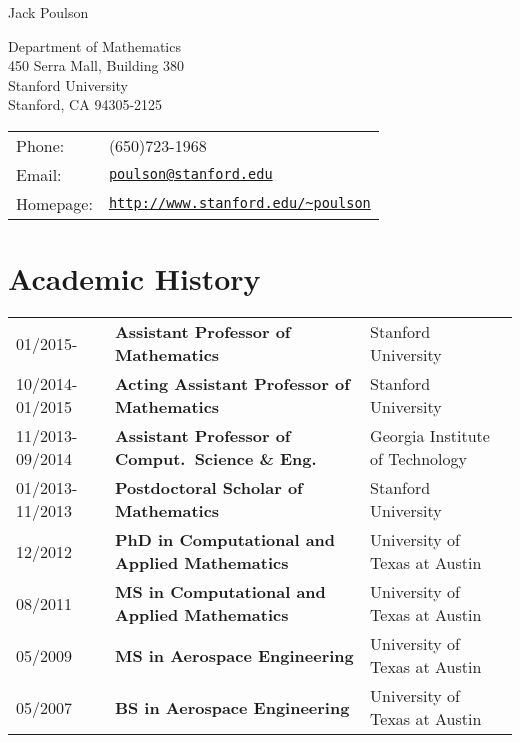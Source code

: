 \documentclass[letterpaper]{article}
\def\name{Jack Poulson}
\begin{document}
{\huge \name}

\vspace{0.25in}

\begin{minipage}{0.45\linewidth}
  Department of Mathematics \\
  450 Serra Mall, Building 380 \\
  Stanford University \\
  Stanford, CA 94305-2125
\end{minipage}
\begin{minipage}{0.45\linewidth}
  \begin{tabular}{ll}
    Phone:&(650)723-1968 \\
    Email:&\href{mailto:poulson@stanford.edu}{\tt poulson@stanford.edu} \\
    Homepage: & \href{http://www.stanford.edu/~poulson}{\tt http://www.stanford.edu/\textasciitilde poulson} \\
  \end{tabular}
\end{minipage}

\section*{Academic History}

\begin{tabular}{lll}
01/2015-        & {\bf Assistant Professor of Mathematics}              & Stanford University \\
10/2014-01/2015 & {\bf Acting Assistant Professor of Mathematics}       & Stanford University \\
11/2013-09/2014 & {\bf Assistant Professor of Comput.\ Science \& Eng.} & Georgia Institute of Technology \\
01/2013-11/2013 & {\bf Postdoctoral Scholar of Mathematics}             & Stanford University \\
12/2012         & {\bf PhD in Computational and Applied Mathematics}    & University of Texas at Austin \\
08/2011         & {\bf MS in Computational and Applied Mathematics}     & University of Texas at Austin \\
05/2009         & {\bf MS in Aerospace Engineering}                     & University of Texas at Austin \\
05/2007         & {\bf BS in Aerospace Engineering}                     & University of Texas at Austin \\
\end{tabular}
\end{document}
